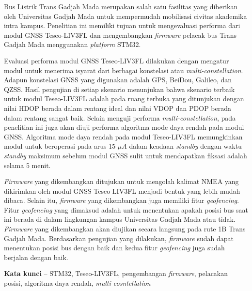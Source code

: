 Bus Listrik Trans Gadjah Mada merupakan salah satu fasilitas yang diberikan oleh Universitas Gadjah Mada untuk mempermudah mobilisasi civitas akademika intra kampus. Penelitian ini memiliki tujuan untuk mengevaluasi performa dari modul GNSS Teseo\hyp{}LIV3FL dan mengembangkan \textit{firmware} pelacak bus Trans Gadjah Mada menggunakan \textit{platform} STM32.

Evaluasi performa modul GNSS Teseo\hyp{}LIV3FL dilakukan dengan mengatur modul untuk menerima isyarat dari berbagai konstelasi atau \textit{multi-constellation}. Adapun konstelasi GNSS yang digunakan adalah GPS, BeiDou, Galileo, dan QZSS. Hasil pengujian di setiap skenario menunjukan bahwa skenario terbaik untuk modul Teseo\hyp{}LIV3FL adalah pada ruang terbuka yang ditunjukan dengan nilai HDOP berada dalam rentang ideal dan nilai VDOP dan PDOP berada dalam rentang sangat baik. Selain menguji performa \textit{multi-constellation}, pada penelitian ini juga akan diuji performa algoritma mode daya rendah pada modul GNSS. Algoritma mode daya rendah pada modul Teseo\hyp{}LIV3FL memungkinkan modul untuk beroperasi pada arus 15 $\mu A$ dalam keadaan \textit{standby} dengan waktu \textit{standby} maksimum sebelum modul GNSS sulit untuk mendapatkan fiksasi adalah selama 5 menit.

\textit{Firmware} yang dikembangkan ditujukan untuk mengolah kalimat NMEA yang dikirimkan oleh modul GNSS Teseo\hyp{}LIV3FL menjadi bentuk yang lebih mudah dibaca. Selain itu, \textit{firmware} yang dikembangkan juga memiliki fitur \textit{geofencing}. Fitur \textit{geofencing} yang dimaksud adalah untuk menentukan apakah posisi bus saat ini berada di dalam lingkungan kampus Universitas Gadjah Mada atau tidak. \textit{Firmware} yang dikembangkan akan diujikan secara langsung pada rute 1B Trans Gadjah Mada. Berdasarkan pengujian yang dilakukan, \textit{firmware} sudah dapat menentukan posisi bus dengan baik dan kedua fitur \textit{geofencing} juga sudah berjalan dengan baik.

\noindent\textbf{Kata kunci} -- STM32, Teseo\hyp{}LIV3FL, pengembangan \textit{firmware}, pelacakan posisi, algoritma daya rendah, \textit{multi-cosntellation}